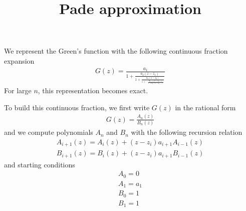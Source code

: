 \documentclass[twocolumn,prl,preprintnumbers,amsmath,amssymb,floatfix]{revtex4}
\begin{document}
\setlength{\pdfpageheight}{\paperheight}
\setlength{\pdfpagewidth}{\paperwidth}

\title{Pade approximation}
\begin{abstract}
\end{abstract}
\maketitle

\begin{widetext}

We represent the Green's function with the following continuous
fraction expansion
\begin{eqnarray}
G(z) = \frac{a_1}{1+\frac{a_2(z-z_1)}{1+\frac{a_3(z-z_2)}{1+\cdots\frac{a_{n-1}(z-z_{n-2})}{1+a_n(z-z_{n-1})}}}}  
\end{eqnarray}
For large $n$, this representation becomes exact.

To build this continuous fraction, we first write $G(z)$ in the
rational form
\begin{eqnarray}
G(z) = \frac{A_n(z)}{B_n(z)}  
\end{eqnarray}
and we compute polynomials $A_n$ and $B_n$ with the following recursion
relation
\begin{eqnarray}
A_{i+1}(z) = A_i(z) + (z-z_i) a_{i+1}A_{i-1}(z)\\
B_{i+1}(z) = B_i(z) + (z-z_i) a_{i+1}B_{i-1}(z)
\end{eqnarray}
and starting conditions
\begin{eqnarray}
A_0=0\\
A_1=a_1\\
B_0=1\\
B_1=1
\end{eqnarray}



\end{widetext}
\end{document}

